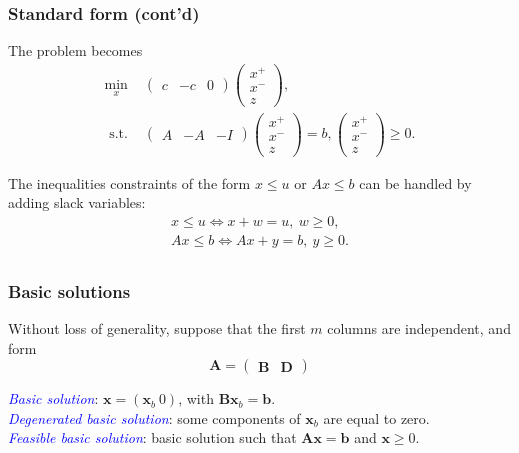 \documentclass{beamer}
\def\bb{\boldsymbol{b}}
\def\bx{\boldsymbol{x}}
\def\bA{\boldsymbol{A}}
\def\bB{\boldsymbol{B}}
\def\bD{\boldsymbol{D}}
\begin{document}
\begin{frame}
\frametitle{Standard form (cont'd)}

The problem becomes
\begin{align*}
\min_x\ &
\begin{pmatrix}
c & -c & 0
\end{pmatrix}
\begin{pmatrix}
x^+ \\ x^- \\ z
\end{pmatrix}, \\
\mbox{ s.t. } &
\begin{pmatrix}
A & -A & -I
\end{pmatrix}
\begin{pmatrix}
x^+ \\ x^- \\ z
\end{pmatrix} = b,
\begin{pmatrix}
x^+ \\ x^- \\ z
\end{pmatrix} \geq 0.
\end{align*}

The inequalities constraints of the form $x \leq u$ or $Ax \leq b$ can be handled by adding slack variables:
\begin{align*}
x \leq u \Leftrightarrow x+w = u,\ w \geq 0, \\
Ax \leq b \Leftrightarrow Ax + y = b,\ y \geq 0. \\
\end{align*}

\end{frame}

\begin{frame}
	\frametitle{Basic solutions}

Without loss of generality, suppose that the first $m$ columns are independent, and form
	\[
	\bA =
	\begin{pmatrix}
		\bB & \bD
	\end{pmatrix}
	\]
	
	\mbox{}
	
	\textcolor{blue}{\it Basic solution}: $\bx = (\bx_b \ 0)$, with $\bB\bx_b = \bb$.\\
	\textcolor{blue}{\it Degenerated basic solution}: some components of $\bx_b$ are equal to zero. \\
	\textcolor{blue}{\it Feasible basic solution}: basic solution such that $\bA\bx = \bb$ and $\bx \geq 0$.

\end{frame}
\end{document}
